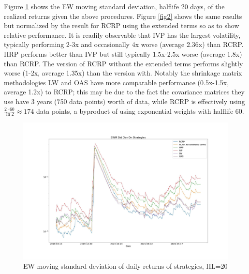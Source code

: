 \documentclass[10pt,twoside,titlepage]{article}   %
\begin{document}
Figure \ref{fig1} shows the EW moving standard deviation, halflife 20 days, of the realized returns given the above procedures. 
Figure \ref{fig2} shows the same results but normalized by the result for RCRP using the extended terms so as to show relative performance. 
It is readily observable that IVP has the largest volatility, typically performing 2-3x and occasionally 4x worse (average 2.36x) than RCRP. 
HRP performs better than IVP but still typically 1.5x-2.5x worse (average 1.8x) than RCRP. 
The version of RCRP without the extended terms performs slightly worse (1-2x, average 1.35x) than the version with. 
Notably the shrinkage matrix methodologies LW and OAS have more comparable performance (0.5x-1.5x, average 1.2x) to RCRP; 
this may be due to the fact the covariance matrices they use have 3 years (\~750 data points) worth of data, 
while RCRP is effectively using $\frac{2 \cdot 60}{\ln 2} \approx 174$ data points, a byproduct of using exponential weights with halflife 60.
\noindent
\begin{figure}[!h]
\includegraphics[width = 1.00\textwidth]{image1.jpg}
\vspace{-1.75\baselineskip}
\caption{EW moving standard deviation of daily returns of strategies, HL=20}
\label{fig1}
\end{figure}
\end{document}
